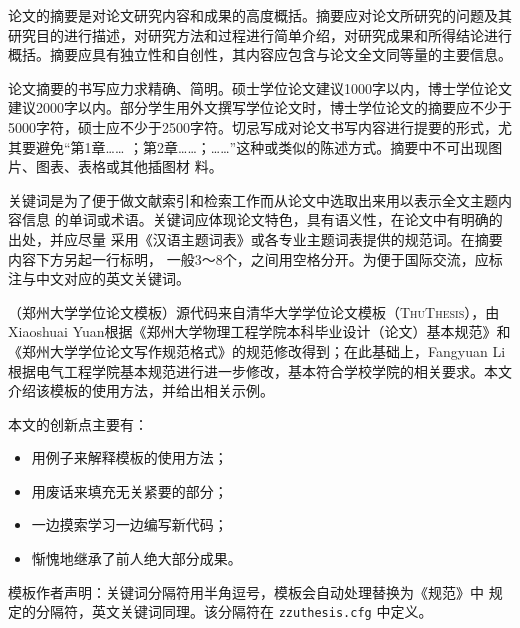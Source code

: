 \begin{cabstract}

论文的摘要是对论文研究内容和成果的高度概括。摘要应对论文所研究的问题及其研究目的进行描述，对研究方法和过程进行简单介绍，对研究成果和所得结论进行概括。摘要应具有独立性和自创性，其内容应包含与论文全文同等量的主要信息。


论文摘要的书写应力求精确、简明。硕士学位论文建议1000字以内，博士学位论文建议2000字以内。部分学生用外文撰写学位论文时，博士学位论文的摘要应不少于5000字符，硕士应不少于2500字符。切忌写成对论文书写内容进行提要的形式，尤其要避免“第1章……
；第2章……；……”这种或类似的陈述方式。摘要中不可出现图片、图表、表格或其他插图材
料。

关键词是为了便于做文献索引和检索工作而从论文中选取出来用以表示全文主题内容信息
的单词或术语。关键词应体现论文特色，具有语义性，在论文中有明确的出处，并应尽量
采用《汉语主题词表》或各专业主题词表提供的规范词。在摘要内容下方另起一行标明，
一般3～8个，之间用空格分开。为便于国际交流，应标注与中文对应的英文关键词。

\zzuthesis{}（郑州大学学位论文模板）源代码来自清华大学学位论文模板（\textsc{ThuThesis}），由Xiaoshuai Yuan根据《郑州大学物理工程学院本科毕业设计（论文）基本规范》和《郑州大学学位论文写作规范格式》的规范修改得到；在此基础上，Fangyuan Li根据电气工程学院基本规范进行进一步修改，基本符合学校学院的相关要求。本文介绍该模板的使用方法，并给出相关示例。

本文的创新点主要有：
  \begin{itemize}
    \item 用例子来解释模板的使用方法；
    \item 用废话来填充无关紧要的部分；
    \item 一边摸索学习一边编写新代码；
    \item 惭愧地继承了前人绝大部分成果。
  \end{itemize}

\textsf{模板作者声明}：关键词分隔符用半角逗号，模板会自动处理替换为《规范》中
规定的分隔符，英文关键词同理。该分隔符在 \verb|zzuthesis.cfg| 中定义。


\end{cabstract}

